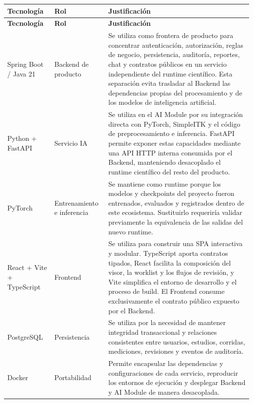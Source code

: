 {\footnotesize
\setlength{\LTleft}{0pt}
\setlength{\LTright}{0pt}
\setlength{\tabcolsep}{2pt}
\renewcommand{\arraystretch}{1.18}
\label{tab:arch-tecnologias}
\begin{longtable}{>{\raggedright\arraybackslash}p{} >{\raggedright\arraybackslash}p{} >{\raggedright\arraybackslash}p{}}
\hline
\textbf{Tecnología} & \textbf{Rol} & \textbf{Justificación} \\
\hline
\endfirsthead
\hline
\textbf{Tecnología} & \textbf{Rol} & \textbf{Justificación} \\
\hline
\endhead
\hline
\endfoot
Spring Boot / Java 21 & Backend de producto & Se utiliza como frontera de producto para concentrar autenticación, autorización, reglas de negocio, persistencia, auditoría, reportes, chat y contratos públicos en un servicio independiente del runtime científico. Esta separación evita trasladar al Backend las dependencias propias del procesamiento y de los modelos de inteligencia artificial. \\
Python + FastAPI & Servicio IA & Se utiliza en el AI Module por su integración directa con PyTorch, SimpleITK y el código de preprocesamiento e inferencia. FastAPI permite exponer estas capacidades mediante una API HTTP interna consumida por el Backend, manteniendo desacoplado el runtime científico del resto del producto. \\
PyTorch & Entrenamiento e inferencia & Se mantiene como runtime porque los modelos y checkpoints del proyecto fueron entrenados, evaluados y registrados dentro de este ecosistema. Sustituirlo requeriría validar previamente la equivalencia de las salidas del nuevo runtime. \\
React + Vite + TypeScript & Frontend & Se utiliza para construir una SPA interactiva y modular. TypeScript aporta contratos tipados, React facilita la composición del visor, la worklist y los flujos de revisión, y Vite simplifica el entorno de desarrollo y el proceso de build. El Frontend consume exclusivamente el contrato público expuesto por el Backend. \\
PostgreSQL & Persistencia & Se utiliza por la necesidad de mantener integridad transaccional y relaciones consistentes entre usuarios, estudios, corridas, mediciones, revisiones y eventos de auditoría. \\
Docker & Portabilidad & Permite encapsular las dependencias y configuraciones de cada servicio, reproducir los entornos de ejecución y desplegar Backend y AI Module de manera desacoplada. \\

\end{longtable}}
